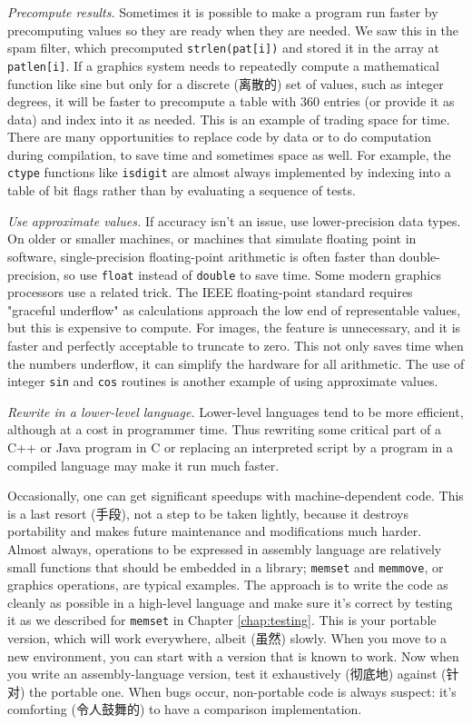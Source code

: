 \emph{Precompute results.} Sometimes it is possible to make a program run
faster by precomputing values so they are ready when they are needed. We
saw this in the spam filter, which precomputed \verb'strlen(pat[i])' and
stored it in the array at \verb'patlen[i]'. If a graphics system needs to
repeatedly compute a mathematical function like sine but only for a
discrete (离散的) set of values, such as integer degrees, it will be faster
to precompute a table with 360 entries (or provide it as data) and index
into it as needed.  This is an example of trading space for time. There are
many opportunities to replace code by data or to do computation during
compilation, to save time and sometimes space as well. For example, the
\verb'ctype' functions like \verb'isdigit' are almost always implemented by
indexing into a table of bit flags rather than by evaluating a sequence of
tests.

\emph{Use approximate values.} If accuracy isn't an issue, use
lower-precision data types.  On older or smaller machines, or machines that
simulate floating point in software, single-precision floating-point
arithmetic is often faster than double-precision, so use \verb'float'
instead of \verb'double' to save time. Some modern graphics processors use
a related trick. The IEEE floating-point standard requires "graceful
underflow" as calculations approach the low end of representable values,
but this is expensive to compute. For images, the feature is unnecessary,
and it is faster and perfectly acceptable to truncate to zero. This not
only saves time when the numbers underflow, it can simplify the hardware
for all arithmetic. The use of integer \verb'sin' and \verb'cos' routines
is another example of using approximate values.

\emph{Rewrite in a lower-level language.} Lower-level languages tend to be
more efficient, although at a cost in programmer time. Thus rewriting some
critical part of a C++ or Java program in C or replacing an interpreted
script by a program in a compiled language may make it run much faster.

Occasionally, one can get significant speedups with machine-dependent code.
This is a last resort (手段), not a step to be taken lightly, because it
destroys portability and makes future maintenance and modifications much
harder.  Almost always, operations to be expressed in assembly language are
relatively small functions that should be embedded in a library;
\verb'memset' and \verb'memmove', or graphics operations, are typical
examples. The approach is to write the code as cleanly as possible in a
high-level language and make sure it's correct by testing it as we
described for \verb'memset' in Chapter \ref{chap:testing}.  This is your
portable version, which will work everywhere, albeit (虽然) slowly.  When
you move to a new environment, you can start with a version that is known
to work.  Now when you write an assembly-language version, test it
exhaustively (彻底地) against (针对) the portable one.  When bugs occur,
non-portable code is always suspect: it's comforting (令人鼓舞的) to have a
comparison implementation.

